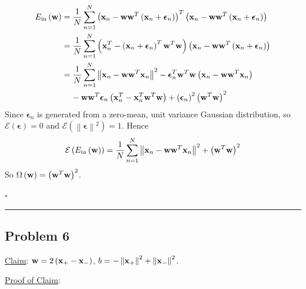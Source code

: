 \documentclass[12pt]{article}
\newcommand*{\QEDB}{\hfill\ensuremath{\square}}
\newcommand{\ParTh}[1]{\left(#1\right)}
\newcommand{\BF}[1]{{\bf#1}}
\newcommand{\VecAbsVal}[1]{\left\|#1\right\|}
\newcommand{\horrule}[1]{\rule{\linewidth}{#1}}
\begin{document}
\begin{align}
E_{\text{in}}\ParTh{\BF{w}}&=\dfrac{1}{N}\sum_{n=1}^{N}\ParTh{\BF{x}_n-\BF{w}\BF{w}^T\ParTh{\BF{x}_n+\bm{\epsilon}_n}}^T\ParTh{\BF{x}_n-\BF{w}\BF{w}^T\ParTh{\BF{x}_n+\bm{\epsilon}_n}}\\
&=\dfrac{1}{N}\sum_{n=1}^{N}\ParTh{\BF{x}^T_n-\ParTh{\BF{x}_n+\bm{\epsilon}_n}^T\BF{w}^T\BF{w}}\ParTh{\BF{x}_n-\BF{w}\BF{w}^T\ParTh{\BF{x}_n+\bm{\epsilon}_n}}\\
\nonumber
&=\dfrac{1}{N}\sum_{n=1}^{N}\VecAbsVal{\BF{x}_n-\BF{w}\BF{w}^T\BF{x}_n}^2-\bm{\epsilon}^T_n\BF{w}^T\BF{w}\ParTh{\BF{x}_n-\BF{w}\BF{w}^T\BF{x}_n}\\
&\hspace{4mm}-\BF{w}\BF{w}^T\bm{\epsilon}_n\ParTh{\BF{x}^T_n-\BF{x}^T_n\BF{w}^T\BF{w}}+\ParTh{\bm{\epsilon}_n}^2\ParTh{\BF{w}^T\BF{w}}^2
\end{align}
Since $\bm{\epsilon}_n$ is generated from a zero-mean, unit variance Gaussian distribution, so $\mathcal{E}\ParTh{\bm{\epsilon}}=0$ and $\mathcal{E}\ParTh{\VecAbsVal{\bm{\epsilon}}^2}=1$. Hence
\begin{align}
\mathcal{E}\ParTh{E_{\text{in}}\ParTh{\BF{w}}}=\dfrac{1}{N}\sum_{n=1}^{N}\VecAbsVal{\BF{x}_n-\BF{w}\BF{w}^T\BF{x}_n}^2+\ParTh{\BF{w}^T\BF{w}}^2
\end{align}
So $\Omega\ParTh{\BF{w}}=\ParTh{\BF{w}^T\BF{w}}^2$.

\QEDB

\horrule{0.5pt}

\subsection*{Problem 6}

\underline{Claim}: $\BF{w}=2\ParTh{\BF{x}_+-\BF{x}_-}$, $b=-\VecAbsVal{\BF{x}_+}^2+\VecAbsVal{\BF{x}_-}^2$.

\underline{Proof of Claim}:
\end{document}
